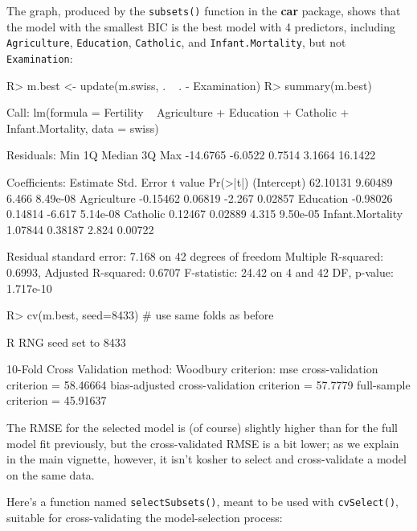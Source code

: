 \documentclass[
]{jss}
\begin{document}
The graph, produced by the \texttt{subsets()} function in the
\textbf{car} package, shows that the model with the smallest BIC is the
best model with 4 predictors, including \texttt{Agriculture},
\texttt{Education}, \texttt{Catholic}, and \texttt{Infant.Mortality},
but not \texttt{Examination}:

\begin{CodeChunk}
\begin{CodeInput}
R> m.best <- update(m.swiss, . ~ . - Examination)
R> summary(m.best)
\end{CodeInput}
\begin{CodeOutput}

Call:
lm(formula = Fertility ~ Agriculture + Education + Catholic + 
    Infant.Mortality, data = swiss)

Residuals:
     Min       1Q   Median       3Q      Max 
-14.6765  -6.0522   0.7514   3.1664  16.1422 

Coefficients:
                 Estimate Std. Error t value Pr(>|t|)
(Intercept)      62.10131    9.60489   6.466 8.49e-08
Agriculture      -0.15462    0.06819  -2.267  0.02857
Education        -0.98026    0.14814  -6.617 5.14e-08
Catholic          0.12467    0.02889   4.315 9.50e-05
Infant.Mortality  1.07844    0.38187   2.824  0.00722

Residual standard error: 7.168 on 42 degrees of freedom
Multiple R-squared:  0.6993,    Adjusted R-squared:  0.6707 
F-statistic: 24.42 on 4 and 42 DF,  p-value: 1.717e-10
\end{CodeOutput}
\begin{CodeInput}
R> cv(m.best, seed=8433) # use same folds as before
\end{CodeInput}
\begin{CodeOutput}
R RNG seed set to 8433
\end{CodeOutput}
\begin{CodeOutput}
10-Fold Cross Validation
method: Woodbury
criterion: mse
cross-validation criterion = 58.46664
bias-adjusted cross-validation criterion = 57.7779
full-sample criterion = 45.91637 
\end{CodeOutput}
\end{CodeChunk}

The RMSE for the selected model is (of course) slightly higher than for
the full model fit previously, but the cross-validated RMSE is a bit
lower; as we explain in the main vignette, however, it isn't kosher to
select and cross-validate a model on the same data.

Here's a function named \texttt{selectSubsets()}, meant to be used with
\texttt{cvSelect()}, suitable for cross-validating the model-selection
process:
\end{document}
